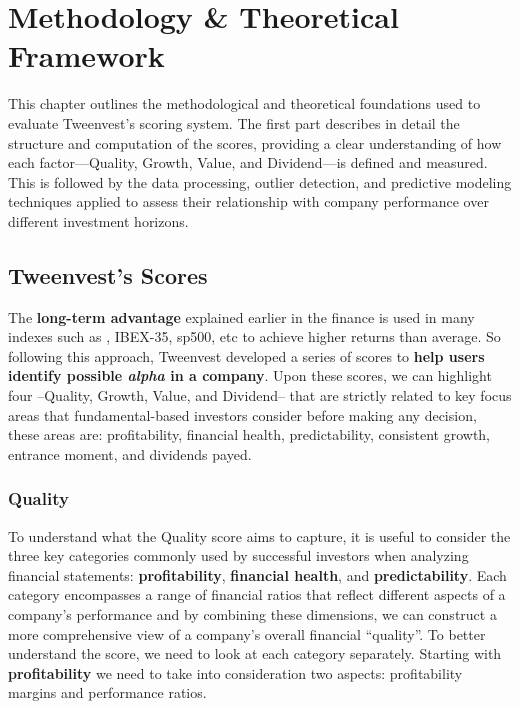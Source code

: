 \documentclass[11pt,english,a4paper,hidelinks]{book}
\begin{document}
\chapter{Methodology \& Theoretical Framework}

\noindent This chapter outlines the methodological and theoretical foundations used to evaluate Tweenvest’s scoring system. The first part describes in detail the structure and computation of the scores, providing a clear understanding of how each factor—Quality, Growth, Value, and Dividend—is defined and measured. This is followed by the data processing, outlier detection, and predictive modeling techniques applied to assess their relationship with company performance over different investment horizons.

\section{Tweenvest's Scores}

The \textbf{long-term advantage} explained earlier in the finance is used in many indexes such as \textcite{msci2024fundamental}, IBEX-35, \acrshort{sp500}, etc to achieve higher returns than average. So following this approach, Tweenvest developed a series of scores to \textbf{help users identify possible \textit{alpha} in a company}. Upon these scores, we can highlight four --Quality, Growth, Value, and Dividend-- that are strictly related to key focus areas that fundamental-based investors consider before making any decision, these areas are: profitability, financial health, predictability, consistent growth, entrance moment, and dividends payed.

\subsection{Quality}

\noindent To understand what the Quality score aims to capture, it is useful to consider the three key categories commonly used by successful investors when analyzing financial statements: \textbf{profitability}, \textbf{financial health}, and \textbf{predictability}. Each category encompasses a range of financial ratios that reflect different aspects of a company's performance and by combining these dimensions, we can construct a more comprehensive view of a company's overall financial ``quality''. To better understand the score, we need to look at each category separately. Starting with \textbf{profitability} we need to take into consideration two aspects: profitability margins and performance ratios.
\end{document}
